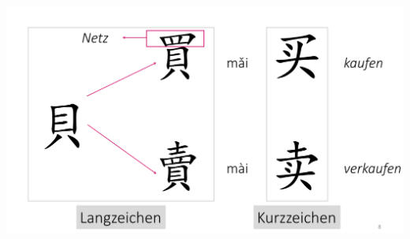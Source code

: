 \documentclass[UTF8]{ctexart}
\begin{document}
\includegraphics[width=\linewidth]{mai.png}
\end{document}
